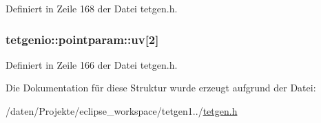 Definiert in Zeile 168 der Datei tetgen.\-h.

\hypertarget{structtetgenio_1_1pointparam_a043a61660f4b9f0e164c91692fdb0ee5}{
\subsubsection[{uv}]{ tetgenio\-::pointparam\-::uv\mbox{[}2\mbox{]}}}\label{structtetgenio_1_1pointparam_a043a61660f4b9f0e164c91692fdb0ee5}


Definiert in Zeile 166 der Datei tetgen.\-h.



Die Dokumentation für diese Struktur wurde erzeugt aufgrund der Datei\-:\begin{DoxyCompactItemize}
\item 
/daten/\-Projekte/eclipse\-\_\-workspace/tetgen1../\hyperlink{tetgen_8h}{tetgen.\-h}\end{DoxyCompactItemize}
